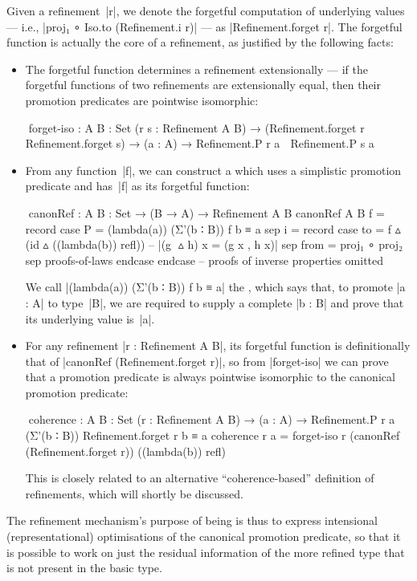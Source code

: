 Given a refinement~|r|, we denote the forgetful computation of underlying values --- i.e., |proj₁ ∘ Iso.to (Refinement.i r)| --- as |Refinement.forget r|.
The forgetful function is actually the core of a refinement, as justified by the following facts:
\begin{itemize}
\item The forgetful function determines a refinement extensionally --- if the forgetful functions of two refinements are extensionally equal, then their promotion predicates are pointwise isomorphic:
\begin{code}
^^^forget-iso :  {A B : Set} (r s : Refinement A B) →
                 (Refinement.forget r ≐ Refinement.forget s) →
                 (a : A) → Refinement.P r a ≅ Refinement.P s a
\end{code}
\item From any function~|f|, we can construct a  which uses a simplistic promotion predicate and has~|f| as its forgetful function:
\begin{code}
^^^canonRef : {A B : Set} → (B → A) → Refinement A B
canonRef {A} {B} f = record
  case  P  =  (lambda(a)) (Σ'(b ∶ B)) f b ≡ a
  sep   i  =  record
                case  to    =  f ▵ (id ▵ ((lambda(b)) refl))  -- |(g ^^^▵ h) x = (g x , h x)|
                sep   from  =  proj₁ ∘ proj₂
                sep   proofs-of-laws endcase endcase  -- proofs of inverse properties omitted
\end{code}
We call |(lambda(a)) (Σ'(b ∶ B)) f b ≡ a| the , which says that, to promote |a : A| to type~|B|, we are required to supply a complete |b : B| and prove that its underlying value is~|a|.
\item For any refinement |r : Refinement A B|, its forgetful function is definitionally that of |canonRef (Refinement.forget r)|, so from |forget-iso| we can prove that a promotion predicate is always pointwise isomorphic to the canonical promotion predicate:
\begin{code}
^^^coherence :
  {A B : Set} (r : Refinement A B) →
  (a : A) → Refinement.P r a ≅ (Σ'(b ∶ B)) Refinement.forget r b ≡ a
coherence r a = forget-iso r (canonRef (Refinement.forget r)) ((lambda(b)) refl)
\end{code}
This is closely related to an alternative ``coherence-based'' definition of refinements, which will shortly be discussed.
\end{itemize}
The refinement mechanism's purpose of being is thus to express intensional (representational) optimisations of the canonical promotion predicate, so that it is possible to work on just the residual information of the more refined type that is not present in the basic type.

